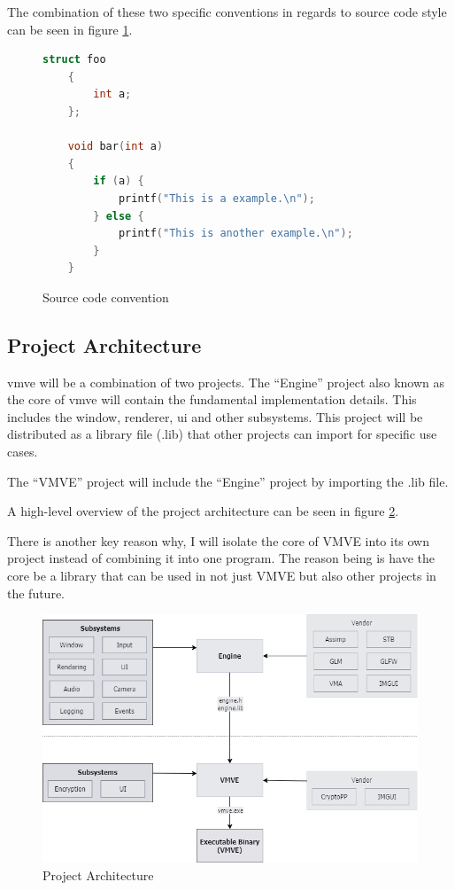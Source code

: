 \documentclass[11pt]{article}
\begin{document}
The combination of these two specific conventions in regards to source code
style can be seen in figure \ref{fig:convention}.

\begin{figure}[ht]
  \centering
  \begin{lstlisting}[language=C++]
    struct foo
    {
        int a;
    };

    void bar(int a)
    {
        if (a) {
            printf("This is a example.\n");
        } else {
            printf("This is another example.\n");
        }
    }
  \end{lstlisting}
  \caption{Source code convention}
  \label{fig:convention}
  \end{figure}



\subsection{Project Architecture}

\gls{vmve} will be a combination of two projects. The ``Engine'' project
also known as the core of \gls{vmve} will contain the fundamental
implementation details. This includes the window, renderer, ui and
other subsystems. This project will be distributed as a library
file (.lib) that other projects can import for specific use cases.

The ``VMVE'' project will include the ``Engine'' project by importing
the .lib file.

A high-level overview of the project architecture can be seen in
figure \ref{fig:projarch}.

There is another key reason why, I will isolate the core of VMVE
into its own project instead of combining it into one program. The
reason being is have the core be a library that can be used in not
just VMVE but also other projects in the future.

\begin{figure}[h!]
  \centering
  \includegraphics[width=\textwidth]{images/project_architecture.png}
  \caption{Project Architecture}
  \label{fig:projarch}
\end{figure}
\end{document}
